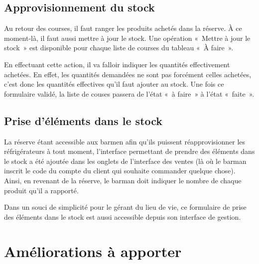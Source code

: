 \documentclass[a4paper]{report}
\begin{document}
\subsection{Approvisionnement du stock}
\par Au retour des courses, il faut ranger les produits achetés dans la réserve. À ce moment-là, il faut aussi mettre à
jour le stock. Une opération « Mettre à jour le stock » est disponible pour chaque liste de courses du tableau « À
faire ».
\par En effectuant cette action, il va falloir indiquer les quantités effectivement achetées. En effet, les quantités
demandées ne sont pas forcément celles achetées, c’est donc les quantités effectives qu’il faut ajouter au stock. Une
fois ce formulaire validé, la liste de couses passera de l’état « à faire » à l’état « faite ».

\subsection{Prise d’éléments dans le stock}
\par La réserve étant accessible aux barmen afin qu’ils puissent réapprovisionner les réfrigérateurs à tout moment,
l’interface permettant de prendre des éléments dans le stock a été ajoutée dans les onglets de l’interface des ventes
(là où le barman inscrit le code du compte du client qui souhaite commander quelque chose). Ainsi, en revenant de la
réserve, le barman doit indiquer le nombre de chaque produit qu’il a rapporté.
\par Dans un souci de simplicité pour le gérant du lieu de vie, ce formulaire de prise des éléments dans le stock est
aussi accessible depuis son interface de gestion.


\section{Améliorations à apporter}
\label{sec:amelioration_a_apporter}
\end{document}
